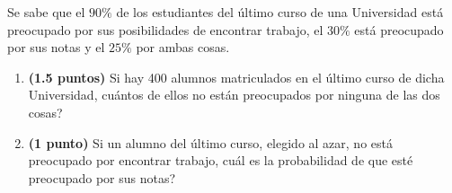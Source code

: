
Se sabe que el $90\%$ de los estudiantes del último curso de una Universidad está preocupado por sus posibilidades de encontrar trabajo, el $30\%$ está preocupado por sus notas y el $25\%$ por ambas cosas.
\begin{enumerate}[label=\alph*)]
\item \textbf{(1.5 puntos)} Si hay 400 alumnos matriculados en el último curso de dicha Universidad, \textquestiondown{}cuántos de ellos no están preocupados por ninguna de las dos cosas?
\item \textbf{(1 punto)} Si un alumno del último curso, elegido al azar, no está preocupado por encontrar trabajo, \textquestiondown{}cuál es la probabilidad de que esté preocupado por sus notas?
\end{enumerate}
